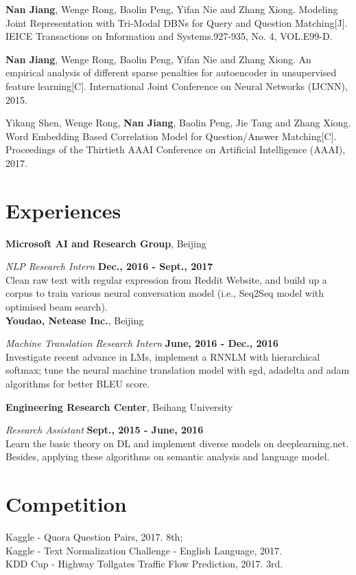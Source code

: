 \documentclass[margin,line]{resume}
\begin{document}
\begin{resume}
\textbf{Nan Jiang}, Wenge Rong, Baolin Peng, Yifan Nie and Zhang Xiong. Modeling Joint Representation with Tri-Modal DBNs for Query and Question Matching[J]. IEICE Transactions on Information and Systems.927-935, No. 4, VOL.E99-D.

\textbf{Nan Jiang}, Wenge Rong, Baolin Peng, Yifan Nie and Zhang Xiong. An empirical analysis of different sparse penalties for autoencoder in unsupervised feature learning[C]. International Joint Conference on Neural Networks (IJCNN), 2015.

Yikang Shen, Wenge Rong, \textbf{Nan Jiang}, Baolin Peng, Jie Tang and Zhang Xiong. Word Embedding Based Correlation Model for Question/Answer Matching[C]. Proceedings of the Thirtieth {AAAI} Conference on Artificial Intelligence (AAAI), 2017.


\section{Experiences}
{\bf Microsoft AI and Research Group}, Beijing

{\em NLP Research Intern} \hfill {\bf Dec., 2016 - Sept., 2017}\\
Clean raw text with regular expression from Reddit Website, and build up a corpus to train various neural conversation model (i.e., Seq2Seq model with optimised beam search).\\


{\bf Youdao, Netease Inc.}, Beijing

{\em Machine Translation Research Intern} \hfill {\bf June, 2016 - Dec., 2016}\\
Investigate recent advance in LMs, implement a RNNLM with hierarchical softmax; tune the neural machine translation model with sgd, adadelta and adam algorithms for better BLEU score.


{\bf Engineering Research Center}, Beihang University

{\em Research Assistant} \hfill {\bf Sept., 2015 - June, 2016}\\
Learn the basic theory on DL and implement diverse models on deeplearning.net. Besides, applying these algorithms on semantic analysis and language model.



\section{Competition}
Kaggle - Quora Question Pairs, 2017. 8th; \\
Kaggle - Text Normalization Challenge - English Language, 2017. \\
KDD Cup - Highway Tollgates Traffic Flow Prediction, 2017. 3rd.


\end{resume}
\end{document}
